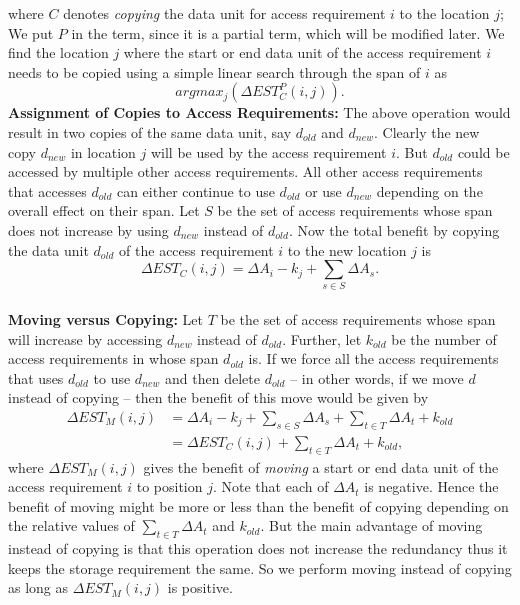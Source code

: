 where $C$ denotes {\it copying} the data unit for access requirement $i$ to the location $j$; We put $P$ in the term, since it is a partial term, which will be modified later. We find the location $j$ where the start or end data unit of the access requirement $i$ needs to be copied  using a simple linear search through the span of $i$ as
\[
argmax_j(\Delta EST_C^P(i,j)).
\]
{\bf Assignment of Copies to Access Requirements:} The above operation would
result in two copies of the same data unit, say $d_{old}$ and $d_{new}$.
Clearly the new copy $d_{new}$ in location $j$ will be used by the access
requirement $i$.  But $d_{old}$ could be accessed by multiple other access
requirements. All other access requirements that accesses $d_{old}$ can either
continue to use $d_{old}$ or use $d_{new}$ depending on the overall effect on
their span. Let $S$ be the set of access requirements whose span does not
increase by using $d_{new}$ instead of $d_{old}$. Now the total benefit by
copying the data unit $d_{old}$ of the access requirement $i$ to the new
location $j$ is
\begin{equation}
\Delta EST_C(i,j) = \Delta A_i - k_j + \sum_{s\in S}\Delta{A_s}.
\label{eq:copyingcost}
\end{equation}
\\
{\bf Moving versus Copying:} Let $T$ be the set of access requirements whose
span will increase by accessing $d_{new}$ instead of $d_{old}$. Further, let
$k_{old}$ be the number of access requirements in whose span $d_{old}$ is. If
we force all the access requirements that uses $d_{old}$ to use $d_{new}$ and
then delete $d_{old}$ -- in other words, if we move $d$ instead of copying --
then the benefit of this move would be given by
\[
\begin{split}
 \Delta EST_M(i,j) & = \Delta A_i - k_j + \sum_{s\in S}\Delta{A_s} + \sum_{t\in
T}\Delta{A_t} + k_{old} \\
		&= \Delta EST_C(i,j) + \sum_{t\in T}\Delta{A_t} + k_{old},
\end{split}
\]
where $\Delta EST_M(i,j)$ gives the benefit of {\it moving} a start or end data unit of the access requirement $i$ to position $j$. Note that each of $\Delta A_t$ is negative. Hence the benefit of moving might be more or less than the benefit of copying depending on the relative values of $\sum_{t\in T}\Delta{A_t}$ and $k_{old}$. But the main advantage of moving instead of copying is that this operation does not increase the redundancy thus it keeps the storage requirement the same. So we perform moving instead of copying as long as $\Delta EST_M(i,j)$ is positive.\\
